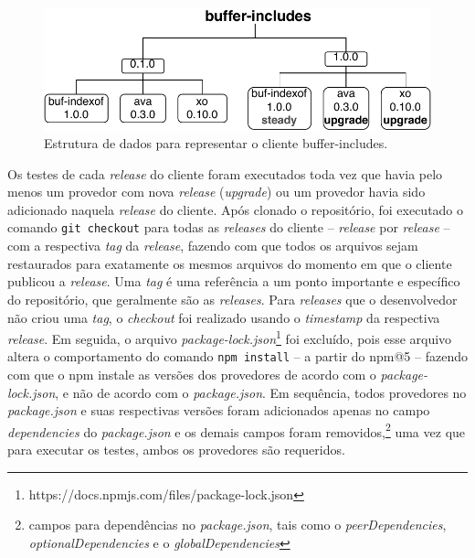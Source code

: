 \begin{figure}
    \centering
    \includegraphics[scale=0.9]{figuras/bcdetect_work.pdf}
    \caption{Estrutura de dados para representar o cliente \textsf{buffer-includes}.}
    \label{fig:bc_work}
\end{figure}{}

Os testes de cada \textit{release} do cliente foram executados toda vez que havia pelo menos um provedor com nova \textit{release} (\textit{upgrade}) ou um provedor havia sido adicionado naquela \textit{release} do cliente. Após clonado o repositório, foi executado o comando \texttt{git checkout} para todas as \textit{releases} do cliente -- \textit{release} por \textit{release} -- com a respectiva \textit{tag} da \textit{release}, fazendo com que todos os arquivos sejam restaurados para exatamente os mesmos arquivos do momento em que o cliente publicou a \textit{release}. Uma \textit{tag} é uma referência a um ponto importante e específico do repositório, que geralmente são as \textit{releases}. Para \textit{releases} que o desenvolvedor não criou uma \textit{tag}, o \textit{checkout} foi realizado usando o \textit{timestamp} da respectiva \textit{release}. Em seguida, o arquivo \textit{package-lock.json}\footnote{https://docs.npmjs.com/files/package-lock.json} foi excluído, pois esse arquivo altera o comportamento do comando \texttt{npm install} -- a partir do \textsf{npm@5} -- fazendo com que o \textsf{npm} instale as versões dos provedores de acordo com o \textit{package-lock.json}, e não de acordo com o \textit{package.json}. Em sequência, todos provedores no \textit{package.json} e suas respectivas versões foram adicionados apenas no campo \textit{dependencies} do \textit{package.json} e os demais campos foram removidos,\footnote{campos para dependências no \textit{package.json}, tais como o \textit{peerDependencies}, \textit{optionalDependencies} e o \textit{globalDependencies}} uma vez que para executar os testes, ambos os provedores são requeridos.

